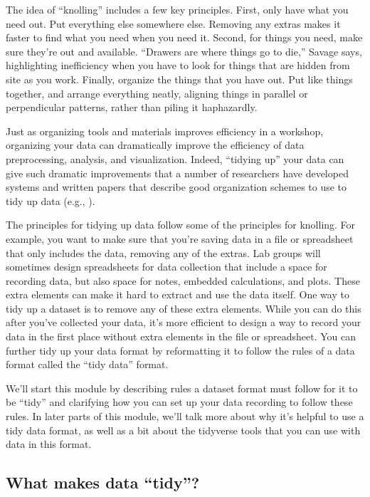 \documentclass[]{tufte-book}
\begin{document}
The idea of ``knolling'' includes a few key principles. First, only have what you
need out. Put everything else somewhere else. Removing any extras makes it
faster to find what you need when you need it. Second, for things you need, make
sure they're out and available. ``Drawers are where things go to die,'' Savage
says, highlighting inefficiency when you have to look
for things that are hidden from site as you work. Finally, organize the things
that you have out. Put like things together, and arrange everything neatly,
aligning things in parallel or perpendicular patterns, rather than piling it
haphazardly.

Just as organizing tools and materials improves efficiency in a workshop,
organizing your data can dramatically improve the efficiency of data
preprocessing, analysis, and visualization. Indeed, ``tidying up'' your data
can give such dramatic improvements that a number of researchers have
developed systems and written papers that describe good organization schemes
to use to tidy up data (e.g., \citep{wickham2014tidy}).

The principles for tidying up data follow some of the principles for knolling.
For example, you want to make sure that you're saving data in a file or
spreadsheet that only includes the data, removing any of the extras. Lab groups
will sometimes design spreadsheets for data collection that include a space for
recording data, but also space for notes, embedded calculations, and plots.
These extra elements can make it hard to extract and use the data itself. One
way to tidy up a dataset is to remove any of these extra elements. While you can
do this after you've collected your data, it's more efficient to design a way to
record your data in the first place without extra elements in the file or
spreadsheet. You can further tidy up your data format by reformatting it to
follow the rules of a data format called the ``tidy data'' format.

We'll start this module by describing rules a dataset format must follow for it
to be ``tidy'' and clarifying how you can set up your data recording to follow
these rules. In later parts of this module, we'll talk more about why it's
helpful to use a tidy data format, as well as a bit about the tidyverse tools
that you can use with data in this format.

\subsection{What makes data ``tidy''?}\label{what-makes-data-tidy}
\end{document}

